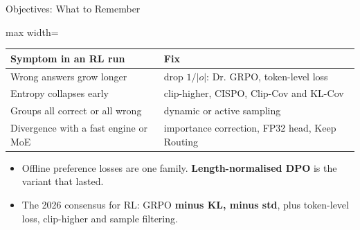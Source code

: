 \begin{frame}{Objectives: What to Remember}
    \begin{center}
    \small
    \begin{adjustbox}{max width=\linewidth}\begin{tabular}{ll}
        \toprule
        \textbf{Symptom in an RL run} & \textbf{Fix} \\
        \midrule
        Wrong answers grow longer & drop $1/|o|$: Dr. GRPO, token-level loss \\
        Entropy collapses early & clip-higher, CISPO, Clip-Cov and KL-Cov \\
        Groups all correct or all wrong & dynamic or active sampling \\
        Divergence with a fast engine or MoE & importance correction, FP32 head, Keep Routing \\
        \bottomrule
    \end{tabular}\end{adjustbox}
    \end{center}
    \begin{itemize}\itemsep0.45em
        \item Offline preference losses are one family. \textbf{Length-normalised DPO} is the variant that lasted.
        \item The 2026 consensus for RL: GRPO \textbf{minus KL, minus std}, plus token-level loss, clip-higher and sample filtering.
    \end{itemize}
    \vspace{0.2em}
\end{frame}

